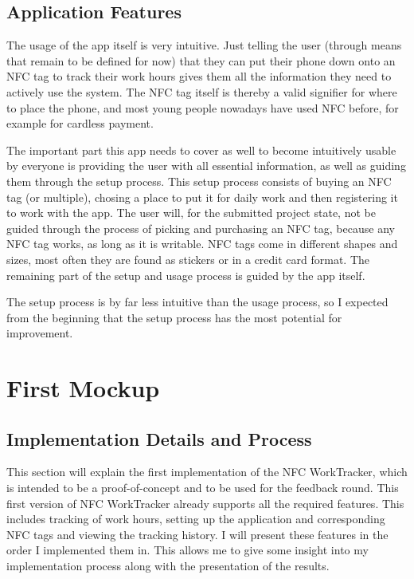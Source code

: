 \documentclass[conference]{IEEEtran}
\newcommand{\projectname}{NFC WorkTracker}
\begin{document}
\subsection{Application Features}
The usage of the app itself is very intuitive. Just telling the user (through means that remain to be defined for now) that they can put their phone down onto an NFC tag to track their work hours gives them all the information they need to actively use the system. The NFC tag itself is thereby a valid signifier for where to place the phone, and most young people nowadays have used NFC before, for example for cardless payment.

The important part this app needs to cover as well to become intuitively usable by everyone is providing the user with all essential information, as well as guiding them through the setup process. This setup process consists of buying an NFC tag (or multiple), chosing a place to put it for daily work and then registering it to work with the app.
The user will, for the submitted project state, not be guided through the process of picking and purchasing an NFC tag, because any NFC tag works, as long as it is writable. NFC tags come in different shapes and sizes, most often they are found as stickers or in a credit card format. The remaining part of the setup and usage process is guided by the app itself.

The setup process is by far less intuitive than the usage process, so I expected from the beginning that the setup process has the most potential for improvement.

\section{First Mockup}
\subsection{Implementation Details and Process}
This section will explain the first implementation of the \projectname{}, which is intended to be a proof-of-concept and to be used for the feedback round. This first version of \projectname{} already supports all the required features. This includes tracking of work hours, setting up the application and corresponding NFC tags and viewing the tracking history. I will present these features in the order I implemented them in. This allows me to give some insight into my implementation process along with the presentation of the results.
\end{document}
